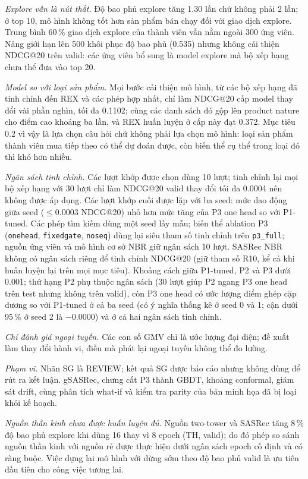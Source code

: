 \documentclass[jtehm]{ieeeaccess}
\begin{document}
\textit{Explore vẫn là nút thắt.} Độ bao phủ explore tăng 1.30 lần chứ không phải 2 lần; ở top 10, mô hình không tốt hơn sản phẩm bán chạy đối với giao dịch explore. Trung bình 60\,\% giao dịch explore của thành viên vẫn nằm ngoài 300 ứng viên. Nâng giới hạn lên 500 khôi phục độ bao phủ (0.535) nhưng không cải thiện NDCG@20 trên valid: các ứng viên bổ sung là model explore mà bộ xếp hạng chưa thể đưa vào top 20.

\textit{Model so với loại sản phẩm.} Mọi bước cải thiện mô hình, từ các bộ xếp hạng đã tinh chỉnh đến REX và các phép hợp nhất, chỉ làm NDCG@20 cấp model thay đổi vài phần nghìn, tối đa 0.1102; cùng các danh sách đó gộp lên product nature cho điểm cao khoảng ba lần, và REX huấn luyện ở cấp này đạt 0.372. Mục tiêu 0.2 vì vậy là lựa chọn câu hỏi chứ không phải lựa chọn mô hình: loại sản phẩm thành viên mua tiếp theo có thể dự đoán được, còn biến thể cụ thể trong loại đó thì khó hơn nhiều.

\textit{Ngân sách tinh chỉnh.} Các lượt khớp được chọn dùng 10 lượt; tinh chỉnh lại mọi bộ xếp hạng với 30 lượt chỉ làm NDCG@20 valid thay đổi tối đa 0.0004 nên không được áp dụng. Các lượt khớp cuối được lặp với ba seed: mức dao động giữa seed ($\le 0.0003$ NDCG@20) nhỏ hơn mức tăng của P3 one head so với P1-tuned. Các phép tìm kiếm dùng một seed lấy mẫu; biến thể ablation P3 (\texttt{onehead}, \texttt{fixedgate}, \texttt{noseq}) dùng lại siêu tham số tinh chỉnh trên \texttt{p3\_full}; nguồn ứng viên và mô hình cơ sở NBR giữ ngân sách 10 lượt. SASRec NBR không có ngân sách riêng để tinh chỉnh NDCG@20 (giữ tham số R10, kể cả khi huấn luyện lại trên mọi mục tiêu). Khoảng cách giữa P1-tuned, P2 và P3 dưới 0.001; thứ hạng P2 phụ thuộc ngân sách (30 lượt giúp P2 ngang P3 one head trên test nhưng không trên valid), còn P3 one head có ước lượng điểm ghép cặp dương so với P1-tuned ở cả ba seed (có ý nghĩa thống kê ở seed 0 và 1; cận dưới 95\,\% ở seed 2 là $-0.0000$) và ở cả hai ngân sách tinh chỉnh.

\textit{Chỉ đánh giá ngoại tuyến.} Các con số GMV chỉ là ước lượng đại diện; đề xuất làm thay đổi hành vi, điều mà phát lại ngoại tuyến không thể đo lường.

\textit{Phạm vi.} Nhãn SG là REVIEW; kết quả SG được báo cáo nhưng không dùng để rút ra kết luận. gSASRec, chưng cất P3 thành GBDT, khoảng conformal, giám sát drift, cùng phân tích what-if và kiểm tra parity của bản minh họa đã bị loại khỏi kế hoạch.

\textit{Nguồn thần kinh chưa được huấn luyện đủ.} Nguồn two-tower và SASRec tăng 8\,\% độ bao phủ explore khi dùng 16 thay vì 8 epoch (TH, valid); do đó phép so sánh nguồn thần kinh với nguồn rẻ được thực hiện dưới ngân sách epoch cố định và có ràng buộc. Việc dựng lại mô hình với dừng sớm theo độ bao phủ valid là ưu tiên đầu tiên cho công việc tương lai.
\end{document}
